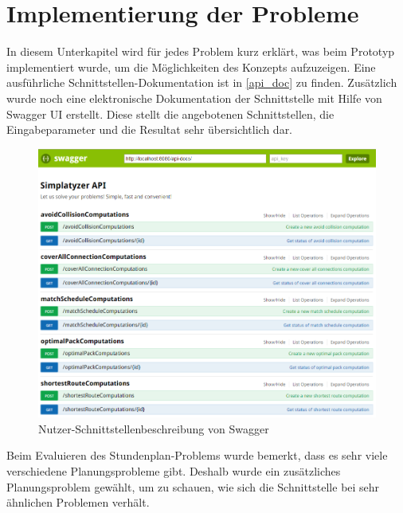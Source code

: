 \section{Implementierung der Probleme}\label{impl_problems}
In diesem Unterkapitel wird für jedes Problem kurz erklärt, was beim Prototyp implementiert wurde, um die Möglichkeiten des Konzepts aufzuzeigen. Eine ausführliche 
Schnittstellen-Dokumentation ist in \autoref{api_doc} zu finden. Zusätzlich wurde noch eine elektronische Dokumentation der Schnittstelle mit Hilfe von Swagger UI \cite{swagger} erstellt. 
Diese stellt die angebotenen Schnittstellen, die Eingabeparameter und die Resultat sehr übersichtlich dar.

\begin{figure}[h]
\centering
\includegraphics[scale=0.5]{images/swagger_api.png}
\caption[Nutzer-Schnittstellenbeschreibung von Swagger]{Nutzer-Schnittstellenbeschreibung von Swagger \selfmade{}}
\label{fig:swagger}
\end{figure}

\FloatBarrier

Beim Evaluieren des Stundenplan-Problems wurde bemerkt, dass es sehr viele verschiedene Planungsprobleme gibt. Deshalb wurde ein zusätzliches Planungsproblem gewählt, 
um zu schauen, wie sich die Schnittstelle bei sehr ähnlichen Problemen verhält.

%
%
%
%


